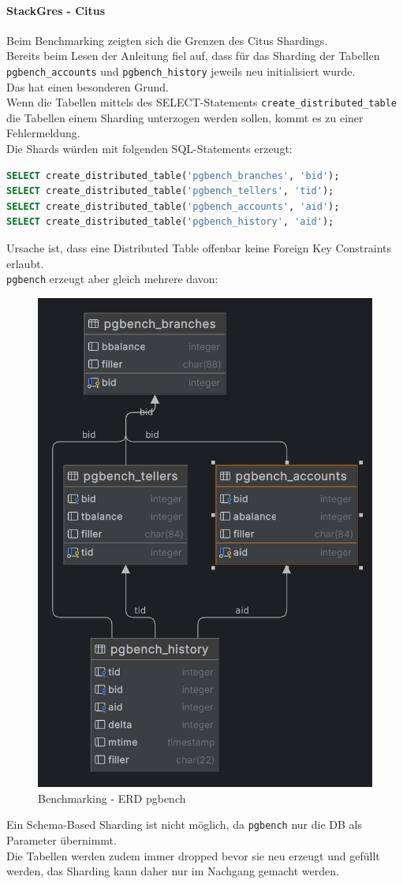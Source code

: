 \begin{flushleft}

    \paragraph{StackGres - Citus}
    Beim Benchmarking zeigten sich die Grenzen des Citus Shardings.\\
    Bereits beim Lesen der Anleitung fiel auf, dass für das Sharding der Tabellen \texttt{pgbench\_accounts} und \texttt{pgbench\_history} jeweils neu initialisiert wurde\cite{6CJFR7RM}.\\
    Das hat einen besonderen Grund.\\
    Wenn die Tabellen mittels des SELECT-Statements \texttt{create\_distributed\_table} die Tabellen einem Sharding unterzogen werden sollen, kommt es zu einer Fehlermeldung.\\
    Die Shards würden mit folgenden SQL-Statements erzeugt:
\lstset{style=gra_codestyle}
\begin{lstlisting}[language=sql, caption=Citus - Benchmarking - Distributed Table Sharding,captionpos=b,label={lst:benchmarking_distributed_table_sharding},breaklines=true]
SELECT create_distributed_table('pgbench_branches', 'bid');
SELECT create_distributed_table('pgbench_tellers', 'tid');
SELECT create_distributed_table('pgbench_accounts', 'aid');
SELECT create_distributed_table('pgbench_history', 'aid');
\end{lstlisting}
    Ursache ist, dass eine Distributed Table offenbar keine Foreign Key Constraints erlaubt.\\
    \texttt{pgbench} erzeugt aber gleich mehrere davon:\\
    \begin{figure}[H]
        \centering
        \includegraphics[width=0.5\linewidth]{source/implementation/evaluation/benchmarking/stackgres_citus/pgbench_accounts}
        \caption{Benchmarking - ERD pgbench}
        \label{fig:pgbench_accounts}
    \end{figure}
    Ein Schema-Based Sharding ist nicht möglich, da \texttt{pgbench} nur die DB als Parameter übernimmt.\\
    Die Tabellen werden zudem immer dropped bevor sie neu erzeugt und gefüllt werden, das Sharding kann daher nur im Nachgang gemacht werden.\\
\end{flushleft}
